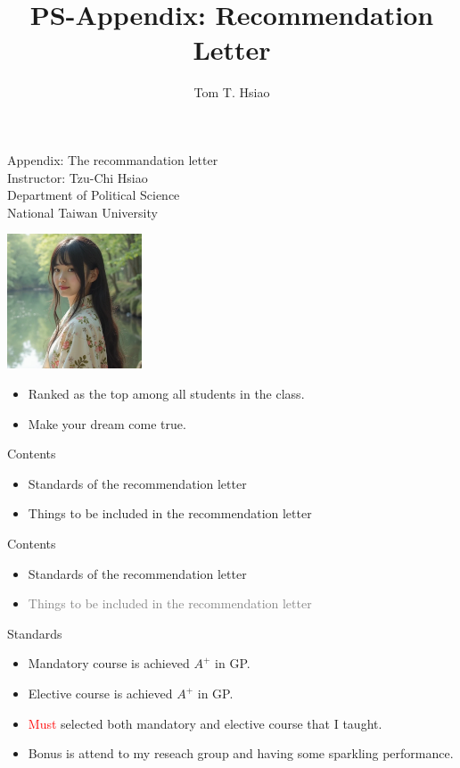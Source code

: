 \documentclass{beamer}
\title{PS-Appendix: Recommendation Letter}
\author{Tom T. Hsiao}
\date{}
\begin{document}
\begin{frame}
\begin{center}
\Large{Appendix: The recommandation letter} \\
\vspace{3em}
\normalsize{Instructor: Tzu-Chi Hsiao} \\
\vspace{3em}
\small{Department of Political Science} \\
\vspace{1em}
\small{National Taiwan University} \\
\end{center}
\end{frame}
\begin{frame}{}
\begin{center}
\includegraphics[width=0.3\textwidth]{letter.png} \\
\end{center}
\begin{itemize}
\item Ranked as the top among all students in the class.
\item Make your dream come true.
\end{itemize}
\end{frame}
\begin{frame}{Contents}
\begin{itemize}
\item Standards of the recommendation letter
\item Things to be included in the recommendation letter
\end{itemize}
\end{frame}
\begin{frame}{Contents}
\begin{itemize}
\item Standards of the recommendation letter
\item \textcolor{gray}{Things to be included in the recommendation letter}
\end{itemize}
\end{frame}
\begin{frame}{Standards}
\begin{itemize}
\item Mandatory course is achieved $A^+$ in GP.
\item Elective course is achieved $A^+$ in GP.
\item \textcolor{red}{Must} selected both mandatory and elective course that I taught.
\item Bonus is attend to my reseach group and having some sparkling performance.
\end{itemize}
\end{frame}
\end{document}
